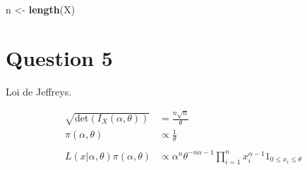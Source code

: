 \documentclass[
  12pt,
]{scrreprt}
\newenvironment{Shaded}{\begin{snugshade}}{\end{snugshade}}
\newcommand{\KeywordTok}[1]{\textcolor[rgb]{0.13,0.29,0.53}{\textbf{#1}}}
\newcommand{\NormalTok}[1]{#1}
\newcommand{\StringTok}[1]{\textcolor[rgb]{0.31,0.60,0.02}{#1}}
\begin{document}
\begin{Shaded}
\begin{Highlighting}[]
\NormalTok{n <-}\StringTok{ }\KeywordTok{length}\NormalTok{(X)}
\end{Highlighting}
\end{Shaded}

\hypertarget{question-5}{%
\section{Question 5}\label{question-5}}

Loi de Jeffreys.

\[\begin{aligned}
\sqrt{\text{det}(I_X(\alpha,\theta))} &= \frac{n\sqrt{n}}{\theta}\\
\pi(\alpha,\theta) &\propto \frac{1}{\theta}\\
&\\
L(x|\alpha,\theta)\pi(\alpha,\theta) &\propto \alpha^n\theta^{-n\alpha-1}\prod_{i=1}^n x_i^{\alpha-1}{1}_{0 \leq x_i \leq \theta}
\end{aligned}\]
\end{document}
